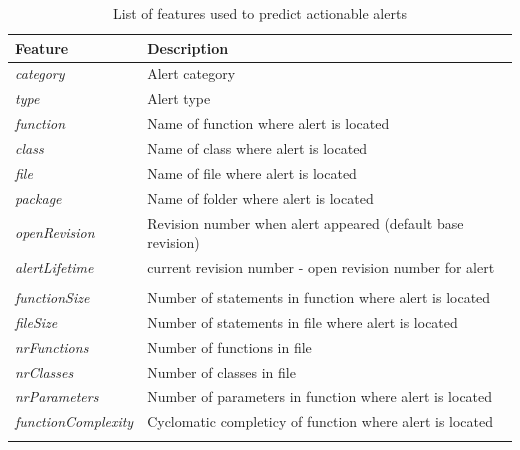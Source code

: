 \begin{longtable}[c]{@{}ll@{}}
	\caption{List of features used to predict actionable alerts}
	\label{act:featuresList}\\
	\toprule
	\textbf{Feature}            & \textbf{Description}                                               \\* \midrule
	\endfirsthead
	\endhead
	\bottomrule
	\endfoot
	\endlastfoot
	\textit{category}           & Alert category                                                     \\
	\textit{type}               & Alert type                                                         \\
	\textit{function}           & Name of function where alert is located                            \\
	\textit{class}              & Name of class where alert is located                               \\
	\textit{file}               & Name of file where alert is located                                \\
	\textit{package}            & Name of folder where alert is located                              \\
	\textit{openRevision}       & Revision number when alert appeared (default base revision)        \\
	\textit{alertLifetime}      & current revision number - open revision number for alert           \\
	\textit{}                   &                                                                    \\
	\textit{functionSize}       & Number of statements in function where alert is located            \\
	\textit{fileSize}           & Number of statements in file where alert is located                \\
	\textit{nrFunctions}        & Number of functions in file                                        \\
	\textit{nrClasses}          & Number of classes in file                                          \\
	\textit{nrParameters}       & Number of parameters in function where alert is located            \\
	\textit{functionComplexity} & Cyclomatic completicy of function where alert is located           \\
	\textit{}                   &                                                                    \\

\end{longtable}
